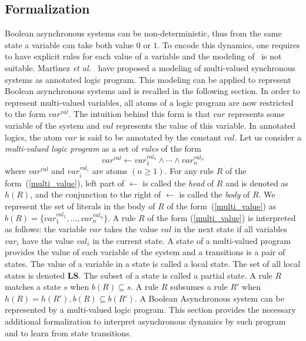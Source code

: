 \subsection{Formalization}
    
	Boolean asynchronous systems can be non-deterministic, thus from the same state a variable can take both value $0$ or $1$.
	To encode this dynamics, one requires to have explicit rules for each value of a variable and the modeling of~\cite{ribeiro2015learning} is not suitable.
	Mart{\'\i}nez \textit{et al.}~\cite{DMTRICLP15} have proposed a modeling of multi-valued synchronous systems as annotated logic program.
    This modeling can be applied to represent Boolean asynchronous systems and is recalled in the following section.
	In order to represent multi-valued variables, all atoms of a logic program are now restricted to the form $var^{val}$.
	The intuition behind this form is that $var$ represents some variable of the system and $val$ represents the value of this variable.
	In annotated logics, the atom $var$ is said to be annotated by the constant $val$.
	Let us consider a {\it multi-valued logic program\/} as a set of {\it rules\/} of the form  
	\begin{equation}\label{multi_value}
		var^{val} \leftarrow var_1^{val_1} \wedge \cdots \wedge var_n^{val_n}
	\end{equation}
	where $var^{val}$ and $var_i^{val_i}$ are atoms $(n \geq 1)$.
	For any rule $R$ of the form~(\ref{multi_value}), left part of $\leftarrow$ is called the {\it head\/} of $R$ and is denoted as $h(R)$,
	and the conjunction to the right of $\leftarrow$ is called the {\it body\/} of $R$.  
	We represent the set of literals in the body of $R$ of the form~(\ref{multi_value}) as $b(R)=\{var_1^{val_1},\ldots,var_n^{val_n}\}$. 
	A rule $R$ of the form (\ref{multi_value}) is interpreted as follows:
	the variable $var$ takes the value $val$ in the next state if all variables $var_i$ have the value $val_i$ in the current state.
	A state of a multi-valued program provides the value of each variable of the system and a transitions is a pair of states.
	The value of a variable in a state is called a local state.
	The set of all local states is denoted $\mathbf{LS}$.
	The subset of a state is called a partial state.
	A rule $R$ matches a state $s$ when $b(R) \subseteq s$.
	A rule $R$ subsumes a rule $R'$ when $h(R)=h(R'), b(R) \subseteq b(R')$.
%
A Boolean Asynchronous system can be represented by a multi-valued logic program.
This section provides the necessary additional formalization to interpret asynchronous dynamics by such program and to learn from state transitions.

